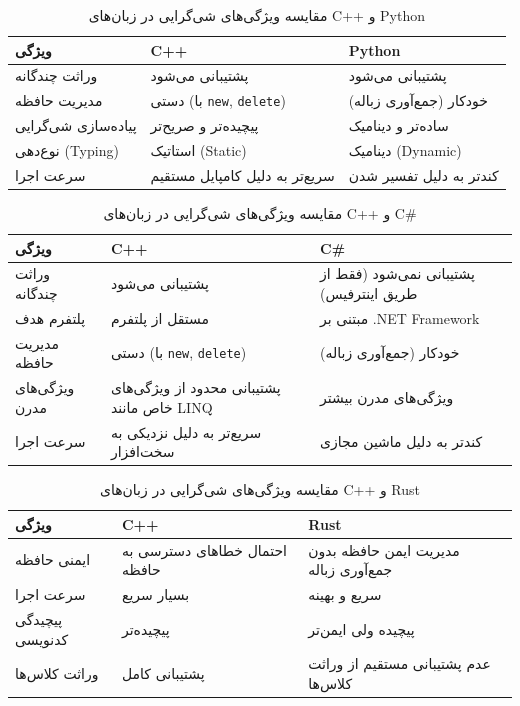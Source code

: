 \documentclass[12pt, a4paper]{report}
\begin{document}
\begin{table}[H]
	\centering
	\begin{tabular}{|p{4cm}|p{3cm}|p{7cm}|}
		\hline
		\textbf{ویژگی} & \textbf{C++} & \textbf{Python} \\
		\hline
		وراثت چندگانه &
		پشتیبانی می‌شود &
		پشتیبانی می‌شود \\
		\hline
		مدیریت حافظه &
		دستی (با \texttt{new}, \texttt{delete}) &
		خودکار (جمع‌آوری زباله) \\
		\hline
		پیاده‌سازی شی‌گرایی &
		پیچیده‌تر و صریح‌تر &
		ساده‌تر و دینامیک \\
		\hline
		نوع‌دهی (Typing) &
		استاتیک (Static) &
		دینامیک (Dynamic) \\
		\hline
		سرعت اجرا &
		سریع‌تر به دلیل کامپایل مستقیم &
		کندتر به دلیل تفسیر شدن \\
		\hline
	\end{tabular}
	\caption{مقایسه ویژگی‌های شی‌گرایی در زبان‌های C++ و Python}
	\label{tab:cpp_vs_python}
\end{table}

\begin{table}[H]
	\centering
	\begin{tabular}{|p{4cm}|p{3cm}|p{7cm}|}
		\hline
		\textbf{ویژگی} & \textbf{C++} & \textbf{C\#} \\
		\hline
		وراثت چندگانه &
		پشتیبانی می‌شود &
		پشتیبانی نمی‌شود (فقط از طریق اینترفیس) \\
		\hline
		پلتفرم هدف &
		مستقل از پلتفرم &
		مبتنی بر .NET Framework \\
		\hline
		مدیریت حافظه &
		دستی (با \texttt{new}, \texttt{delete}) &
		خودکار (جمع‌آوری زباله) \\
		\hline
		ویژگی‌های مدرن &
		پشتیبانی محدود از ویژگی‌های خاص مانند LINQ &
		ویژگی‌های مدرن بیشتر \\
		\hline
		سرعت اجرا &
		سریع‌تر به دلیل نزدیکی به سخت‌افزار &
		کندتر به دلیل ماشین مجازی \\
		\hline
	\end{tabular}
	\caption{مقایسه ویژگی‌های شی‌گرایی در زبان‌های C++ و C\#}
	\label{tab:cpp_vs_csharp}
\end{table}

\begin{table}[H]
	\centering
	\begin{tabular}{|p{4cm}|p{3cm}|p{7cm}|}
		\hline
		\textbf{ویژگی} & \textbf{C++} & \textbf{Rust} \\
		\hline
		ایمنی حافظه &
		احتمال خطاهای دسترسی به حافظه &
		مدیریت ایمن حافظه بدون جمع‌آوری زباله \\
		\hline
		سرعت اجرا &
		بسیار سریع &
		سریع و بهینه \\
		\hline
		پیچیدگی کدنویسی &
		پیچیده‌تر &
		پیچیده ولی ایمن‌تر \\
		\hline
		وراثت کلاس‌ها &
		پشتیبانی کامل &
		عدم پشتیبانی مستقیم از وراثت کلاس‌ها \\
		\hline
	\end{tabular}
	\caption{مقایسه ویژگی‌های شی‌گرایی در زبان‌های C++ و Rust}
	\label{tab:cpp_vs_rust}
\end{table}
\end{document}
